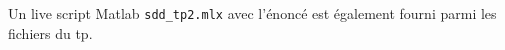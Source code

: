 \documentclass[11pt,twoside,a4paper]{article}
\begin{document}


\cleardoublepage
\tableofcontents
\newpage

Un live script Matlab \texttt{sdd\_tp2.mlx} avec l'énoncé est également fourni parmi les fichiers du tp.




\end{document}

